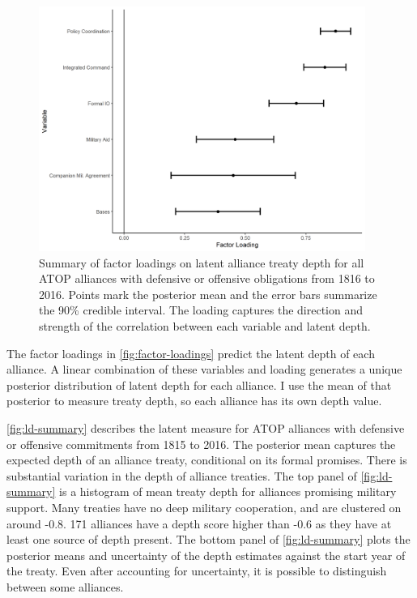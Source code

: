 \documentclass[12pt]{article}
\begin{document}
 
\begin{figure}
	\centering
		\includegraphics[width=0.95\textwidth]{../figures/factor-loadings.png}
	\caption{Summary of factor loadings on latent alliance treaty depth for all ATOP alliances with defensive or offensive obligations from 1816 to 2016. Points mark the posterior mean and the error bars summarize the 90\% credible interval. The loading captures the direction and strength of the correlation between each variable and latent depth.}
	\label{fig:factor-loadings}
\end{figure}


The factor loadings in \autoref{fig:factor-loadings} predict the latent depth of each alliance. 
A linear combination of these variables and loading generates a unique posterior distribution of latent depth for each alliance. 
I use the mean of that posterior to measure treaty depth, so each alliance has its own depth value. 


\autoref{fig:ld-summary} describes the latent measure for ATOP alliances with defensive or offensive commitments from 1815 to 2016.
The posterior mean captures the expected depth of an alliance treaty, conditional on its formal promises. 
There is substantial variation in the depth of alliance treaties. 
The top panel of \autoref{fig:ld-summary} is a histogram of mean treaty depth for alliances promising military support.  
Many treaties have no deep military cooperation, and are clustered on around -0.8.  
171 alliances have a depth score higher than -0.6 as they have at least one source of depth present. 
The bottom panel of \autoref{fig:ld-summary} plots the posterior means and uncertainty of the depth estimates against the start year of the treaty. 
Even after accounting for uncertainty, it is possible to distinguish between some alliances. 
\end{document}
